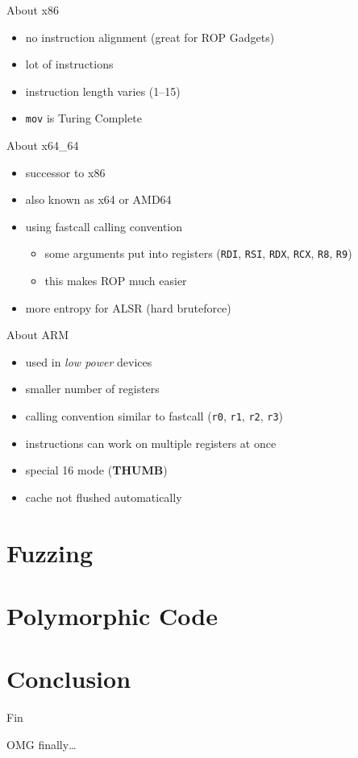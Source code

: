 \documentclass[beamer]{uibk}
\begin{document}
\begin{frame}{About x86}
    \begin{itemize}
        \item no instruction alignment (great for ROP Gadgets)
        \item lot of instructions
        \item instruction length varies (\SIrange{1}{15}{\byte})
        \item \texttt{mov} is Turing Complete
    \end{itemize}
\end{frame}

\begin{frame}{About x64\_64}
    \begin{itemize}
        \item successor to x86
        \item also known as x64 or AMD64
        \item using fastcall calling convention
            \begin{itemize}
                \item some arguments put into registers (\texttt{RDI},
                    \texttt{RSI}, \texttt{RDX}, \texttt{RCX}, \texttt{R8},
                    \texttt{R9})
                \item this makes ROP much easier
            \end{itemize}
        \item more entropy for ALSR (hard bruteforce)\
    \end{itemize}
\end{frame}

\begin{frame}{About ARM}
    \begin{itemize}
        \item used in \emph{low power} devices
        \item smaller number of registers
        \item calling convention similar to fastcall (\texttt{r0}, \texttt{r1},
            \texttt{r2}, \texttt{r3})
        \item instructions can work on multiple registers at once
        \item special \SI{16}{\bit} mode (\textbf{THUMB})
        \item cache not flushed automatically
    \end{itemize}
\end{frame}

\section{Fuzzing}

\section{Polymorphic Code}

\section*{Conclusion}

\begin{frame}{Fin}
   \begin{center}
       \huge OMG finally\dots
   \end{center}
\end{frame}
\end{document}
